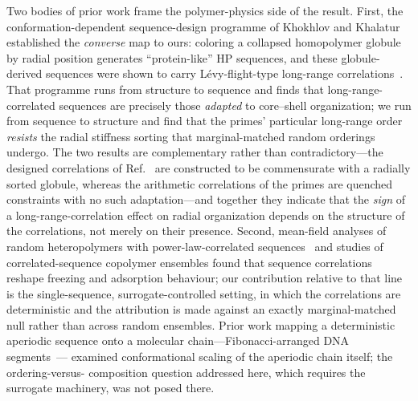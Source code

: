 \documentclass[11pt]{article}
\begin{document}
Two bodies of prior work frame the polymer-physics side of the result. First, the
conformation-dependent sequence-design programme of Khokhlov and
Khalatur~\cite{KhokhlovKhalatur} established the \emph{converse} map to ours:
coloring a collapsed homopolymer globule by radial position generates
``protein-like'' HP sequences, and these globule-derived sequences were shown to
carry L\'evy-flight-type long-range correlations~\cite{Govorun}. That programme
runs from structure to sequence and finds that long-range-correlated sequences are
precisely those \emph{adapted} to core--shell organization; we run from sequence to
structure and find that the primes' particular long-range order \emph{resists} the
radial stiffness sorting that marginal-matched random orderings undergo. The two
results are complementary rather than contradictory---the designed correlations of
Ref.~\cite{Govorun} are constructed to be commensurate with a radially sorted
globule, whereas the arithmetic correlations of the primes are quenched constraints
with no such adaptation---and together they indicate that the \emph{sign} of a
long-range-correlation effect on radial organization depends on the structure of
the correlations, not merely on their presence. Second, mean-field analyses of
random heteropolymers with power-law-correlated sequences~\cite{Mamasakhlisov} and
studies of correlated-sequence copolymer ensembles found that sequence correlations
reshape freezing and adsorption behaviour; our contribution relative to that line
is the single-sequence, surrogate-controlled setting, in which the correlations are
deterministic and the attribution is made against an exactly marginal-matched null
rather than across random ensembles. Prior work mapping a deterministic aperiodic
sequence onto a molecular chain---Fibonacci-arranged DNA segments~\cite{Azevedo}---
examined conformational scaling of the aperiodic chain itself; the ordering-versus-
composition question addressed here, which requires the surrogate machinery, was
not posed there.
\end{document}
